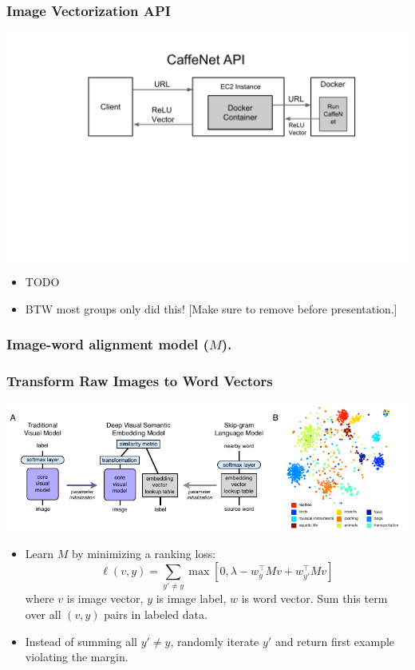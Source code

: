 \documentclass{beamer}
\begin{document}
\begin{frame}
  \frametitle{Image Vectorization API}
  \begin{center}
    \includegraphics[width=\textwidth]{assets/CaffeNetAPI.pdf}
  \end{center}
  \begin{itemize}
    \item TODO
    \item BTW most groups only did this! [Make sure to remove before presentation.]
  \end{itemize}
\end{frame}

\begin{frame}
  \frametitle{Image-word alignment model ($M$).}
\end{frame}

\begin{frame}
  \frametitle{Transform Raw Images to Word Vectors}
  \begin{center}
    \includegraphics[width=\textwidth]{assets/devise.pdf}
  \end{center}
  \begin{itemize}
    \item Learn $M$ by minimizing a ranking loss: $$\ell(v, y) = \sum_{y' \neq y} \max \left[0, \lambda - w_{y}^\top M v + w_{y'} ^\top M v \right]$$ where $v$ is image vector, $y$ is image label, $w$ is word vector. Sum this term over all $(v, y)$ pairs in labeled data.
    \item Instead of summing all $y' \neq y$, randomly iterate $y'$ and return first example violating the margin.
  \end{itemize}
\end{frame}
\end{document}
